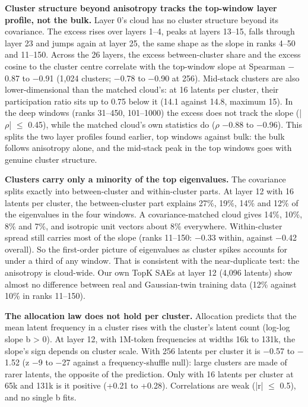 \documentclass[11pt]{article}
\begin{document}
\textbf{Cluster structure beyond anisotropy tracks the top-window layer profile, not the bulk.} Layer 0's cloud has no cluster structure beyond its covariance. The excess rises over layers 1--4, peaks at layers 13--15, falls through layer 23 and jumps again at layer 25, the same shape as the slope in ranks 4--50 and 11--150. Across the 26 layers, the excess between-cluster share and the excess cosine to the cluster centre correlate with the top-window slope at Spearman $-$0.87 to $-$0.91 (1,024 clusters; $-$0.78 to $-$0.90 at 256). Mid-stack clusters are also lower-dimensional than the matched cloud's: at 16 latents per cluster, their participation ratio sits up to 0.75 below it (14.1 against 14.8, maximum 15). In the deep windows (ranks 31--450, 101--1000) the excess does not track the slope (|$\rho$| $\le$ 0.45), while the matched cloud's own statistics do ($\rho$ $-$0.88 to $-$0.96). This splits the two layer profiles found earlier, top windows against bulk: the bulk follows anisotropy alone, and the mid-stack peak in the top windows goes with genuine cluster structure.

\textbf{Clusters carry only a minority of the top eigenvalues.} The covariance splits exactly into between-cluster and within-cluster parts. At layer 12 with 16 latents per cluster, the between-cluster part explains 27\%, 19\%, 14\% and 12\% of the eigenvalues in the four windows. A covariance-matched cloud gives 14\%, 10\%, 8\% and 7\%, and isotropic unit vectors about 8\% everywhere. Within-cluster spread still carries most of the slope (ranks 11--150: $-$0.33 within, against $-$0.42 overall). So the first-order picture of eigenvalues as cluster spikes accounts for under a third of any window. That is consistent with the near-duplicate test: the anisotropy is cloud-wide. Our own TopK SAEs at layer 12 (4,096 latents) show almost no difference between real and Gaussian-twin training data (12\% against 10\% in ranks 11--150).

\textbf{The allocation law does not hold per cluster.} Allocation predicts that the mean latent frequency in a cluster rises with the cluster's latent count (log-log slope b > 0). At layer 12, with 1M-token frequencies at widths 16k to 131k, the slope's sign depends on cluster scale. With 256 latents per cluster it is $-$0.57 to $-$1.52 (z $-$9 to $-$27 against a frequency-shuffle null): large clusters are made of rarer latents, the opposite of the prediction. Only with 16 latents per cluster at 65k and 131k is it positive (+0.21 to +0.28). Correlations are weak (|r| $\le$ 0.5), and no single b fits.
\end{document}
